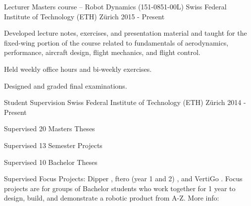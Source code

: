 \label{sec:teaching}
\begin{cventries}


\cvprojwideentry
  	{Lecturer} %
  	{Masters course -- Robot Dynamics (151-0851-00L)} %
    {Swiss Federal Institute of Technology (ETH) Z\"{u}rich} %
    {2015 - Present} %
    {
      \begin{cvitems} %
        \item Developed lecture notes, exercises, and presentation material and taught for the fixed-wing portion of the course related to fundamentals of aerodynamics, performance, aircraft design, flight mechanics, and flight control.
		\item Held weekly office hours and bi-weekly exercises.
		\item Designed and graded final examinations.
      \end{cvitems}
    } %
    {} %
    {\showprojectdescriptions}
\vspace*{-9pt}
\cvprojwideentry
  	{Student Supervision} %
  	{} %
    {Swiss Federal Institute of Technology (ETH) Z\"{u}rich} %
    {2014 - Present} %
    {
      \begin{cvitems} %
        \item Supervised 20 Masters Theses
		\item Supervised 13 Semester Projects
		\item Supervised 10 Bachelor Theses
		\item Supervised Focus Projects: Dipper , ftero (year 1 and 2) , and VertiGo . Focus projects are for groups of Bachelor students who work together for 1 year to design, build, and demonstrate a robotic product from A-Z. More info: 

\end{cvitems}}
\end{cventries}
